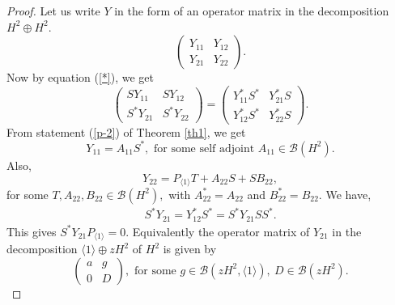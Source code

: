 \documentclass[12pt, reqno]{amsart}
\theoremstyle{definition}
\theoremstyle{remark}
\numberwithin{equation}{section}
\begin{document}
        \begin{proof}
            Let us write $Y$ in the form of an operator matrix in the decomposition $H^2\oplus H^2$.
           \begin{equation*}
               \begin{pmatrix}
                   Y_{11}&Y_{12}\\
                   Y_{21}&Y_{22}
               \end{pmatrix}.
           \end{equation*}
           Now by equation (\ref{*}), we get
           \begin{equation*}
                \begin{pmatrix}
                   SY_{11}&SY_{12}\\
                   S^*Y_{21}&S^*Y_{22}
               \end{pmatrix}
               =
               \begin{pmatrix}
                   Y^*_{11}S^*&Y^*_{21}S\\
                   Y^*_{12}S^*&Y^*_{22}S
               \end{pmatrix}.
           \end{equation*}
           From statement (\ref{p-2}) of Theorem \ref{th1}, we get
           \begin{equation*}
                Y_{11}=A_{11}S^*, \text{ for some self adjoint } A_{11}\in \mathcal{B}(H^2).
           \end{equation*}
           Also, 
           \begin{equation*}
               Y_{22}=P_{\langle 1\rangle}T+A_{22}S+SB_{22},
           \end{equation*}
           for some $T,A_{22},B_{22} \in \mathcal{B}(H^2),$ with $A^*_{22}=A_{22}$ and $B^*_{22}=B_{22}.$
           We have,
           \begin{align*}
              S^*Y_{21} =Y^*_{12}S^*
              =S^*Y_{21}SS^*.
            \end{align*}
            This gives $S^*Y_{21}P_{\langle 1\rangle}=0.$
            Equivalently the operator matrix of $Y_{21}$ in the decomposition $\langle1\rangle \oplus zH^2$ of $H^2$ is given by
            \begin{equation*}
                \begin{pmatrix}
                    a&g\\
                    0&D
                \end{pmatrix},\text{ for some } g\in \mathcal{B}(zH^2,\langle1\rangle),~ D\in \mathcal{B}(zH^2).

\end{equation*}
\end{proof}
\end{document}
